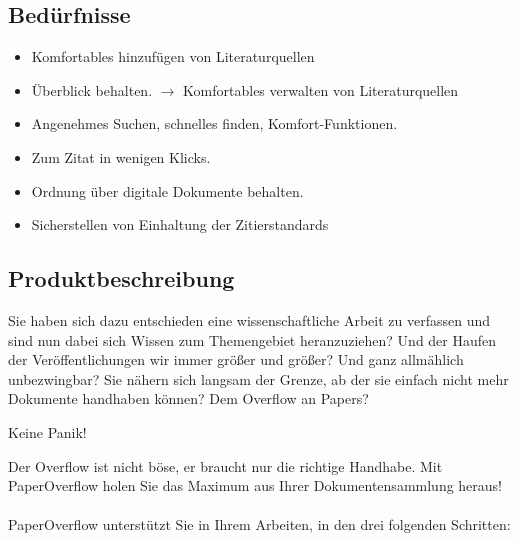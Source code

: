 \documentclass[a4paper,12pt]{article}
\begin{document}
\subsection{Bedürfnisse}
\begin{itemize}
\item Komfortables hinzufügen von Literaturquellen
\item Überblick behalten. $\to$ Komfortables verwalten von Literaturquellen
\item Angenehmes Suchen, schnelles finden, Komfort-Funktionen.
\item Zum Zitat in wenigen Klicks.
\item Ordnung über digitale Dokumente behalten.
\item Sicherstellen von Einhaltung der Zitierstandards
\end{itemize}

\subsection{Produktbeschreibung}

Sie haben sich dazu entschieden eine wissenschaftliche Arbeit zu verfassen und sind nun dabei sich Wissen zum Themengebiet heranzuziehen? Und der Haufen der Veröffentlichungen wir immer größer und größer? Und ganz allmählich unbezwingbar? Sie nähern sich langsam der Grenze, ab der sie einfach nicht mehr Dokumente handhaben können? Dem Overflow an Papers? 
\begin{center}
Keine Panik! 
\end{center}
Der Overflow ist nicht böse, er braucht nur die richtige Handhabe. Mit PaperOverflow holen Sie das Maximum aus Ihrer Dokumentensammlung heraus!\\ \\
PaperOverflow unterstützt Sie in Ihrem Arbeiten, in den drei folgenden Schritten:
\end{document}
